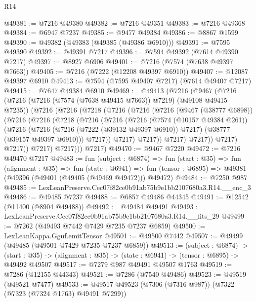 \begin{lexlean}{R14}
\begin{coremodule}
@49381 := @7216 @49380
@49382 := @7216 @49351
@49383 := @7216 @49368
@49384 := @6947 @7237
@49385 := @9477 @49384
@49386 := @8867 @1599
@49390 := @49382 (@49383 (@49385 (@49386 @6910)))
@49391 := @7595 @49390
@49392 := @49391 @7217
@49396 := @7594 @49392 (@7614 @49390 @7217)
@49397 := @8927 @6906
@49401 := @7216 (@7574 (@7638 @49397 @7663))
@49405 := @7216 (@7222 (@12208 @49397 @6910))
@49407 := @12087 @49397 @6910
@49413 := @7594 (@7595 @49407 @7217) (@7614 @49407 @7217)
@49415 := @7647 @49384 @6910
@49469 := @49413
    (@7216
      (@9467
        (@7216
          (@7216 (@7216 (@7574 (@7638 @49415 @7663)) @7219) (@49108 @49415 @7235))
          (@7216
            (@7216
              (@7218
                (@7216
                  (@7216
                    (@7216
                      (@9467 (@38777 @6898))
                      (@7216
                        (@7216
                          (@7218
                            (@7216
                              (@7216
                                (@7216
                                  (@7574 (@10157 @49384 @261))
                                  (@7216
                                    (@7216
                                      (@7216 (@7222 (@39132 @49397 @6910)) @7217)
                                      (@38777 (@39157 @49397 @6910)))
                                    @7217))
                                @7217)
                              @7217))
                          @7217)
                        @7217))
                    @7217)
                  @7217))
              @7217)
            @7217)))
      @7217)
@49470 := @9467 @7220
@49472 := @7216 @49470 @7217
@49483 := fun (subject : @6874) =>
  fun (start : @35) =>
  fun (alignment : @35) =>
  fun (state : @6941) =>
  fun (tensor : @6895) => @49381 (@49396 (@49401 (@49405 (@49469 @49472))) @49472)
@49484 := @7250 @987
@49485 := LexLeanPreserve.Cec07f82ce0b91ab75b9e1bb2107680a3.R14.__enc_3
@49486 := @49485 @7237
@49488 := @6857 @49486 @44345
@49491 := @12542 (@11400 (@8904 @49488))
@49492 := @49484 @49491
@49493 := LexLeanPreserve.Cec07f82ce0b91ab75b9e1bb2107680a3.R14.__fits_29
@49499 := @7262 (@49493 @7442 @7429 @7235 @7237 @6859)
@49500 := LexLeanKappa.Gguf.emitTensor
@49501 := @49500 @7442
@49507 := @49499 (@49485 (@49501 @7429 @7235 @7237 @6859))
@49513 := (subject : @6874) ->
  (start : @35) -> (alignment : @35) -> (state : @6941) -> (tensor : @6895) -> @49492 @49507
@49517 := @7279 @987 @49491 @49507 @1763
@49519 := @7286 (@12155 @44343)
@49521 := @7286 (@7540 @49486)
@49523 := @49519 (@49521 @7477)
@49533 := @49517 @49523 (@7306 (@7316 @987)) (@7322 (@7323 (@7324 @1763) @49491 @7299))

\end{coremodule}
\end{lexlean}
